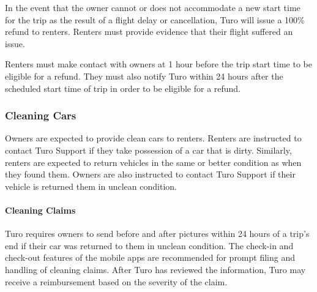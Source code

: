 \documentclass[review,12pt]{elsarticle}
\begin{document}
    In the event that the owner cannot or does not accommodate a new start time for the trip as the result of a flight delay or cancellation, Turo will issue a 100\% refund to renters. Renters must provide evidence that their flight suffered an issue.

    Renters must make contact with owners at 1 hour before the trip start time to be eligible for a refund. They must also notify Turo within 24 hours after the scheduled start time of trip in order to be eligible for a refund.

  \subsubsection{Cleaning Cars}
  Owners are expected to provide clean cars to renters. Renters are instructed to contact Turo Support if they take possession of a car that is dirty. Similarly, renters are expected to return vehicles in the same or better condition as when they found them. Owners are also instructed to contact Turo Support if their vehicle is returned them in unclean condition.

    \paragraph{Cleaning Claims}
    Turo requires owners to send before and after pictures within 24 hours of a trip's end if their car was returned to them in unclean condition. The check-in and check-out features of the mobile apps are recommended for prompt filing and handling of cleaning claims. After Turo has reviewed the information, Turo may receive a reimbursement based on the severity of the claim.
\end{document}
